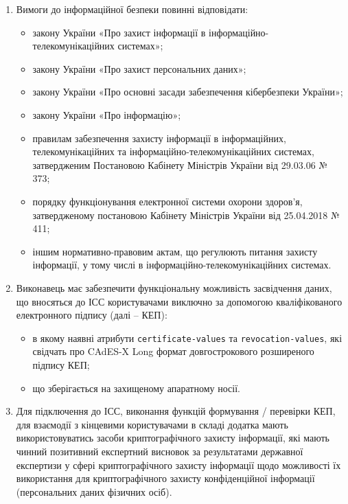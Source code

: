 \documentclass{article}
\begin{document}
\begin{enumerate}
  \item Вимоги до інформаційної безпеки повинні відповідати:
    \begin{itemize}
      \item закону України «Про захист інформації в інформаційно-телекомунікаційних системах»;
      \item закону України «Про захист персональних даних»;
      \item закону України «Про основні засади забезпечення кібербезпеки України»;
      \item закону України «Про інформацію»;
      \item правилам забезпечення захисту інформації в інформаційних, телекомунікаційних та інформаційно-телекомунікаційних системах, затвердженим Постановою Кабінету Міністрів України від 29.03.06 № 373;
      \item порядку функціонування електронної системи охорони здоров’я, затвердженому постановою Кабінету Міністрів України від 25.04.2018 № 411;
      \item іншим нормативно-правовим актам, що регулюють питання захисту інформації, у тому числі в інформаційно-телекомунікаційних системах.
    \end{itemize}

  \item Виконавець має забезпечити функціональну можливість засвідчення даних, що вносяться до ІСС
        користувачами виключно за допомогою кваліфікованого електронного підпису (далі – КЕП):
    \begin{itemize}
      \item в якому наявні атрибути \texttt{certificate-values} та \texttt{revocation-values},
            які свідчать про CAdES-X Long формат довгострокового розширеного підпису КЕП;
      \item що зберігається на захищеному апаратному носії.
    \end{itemize}

  \item Для підключення до ІСС, виконання функцій формування / перевірки КЕП, для взаємодії з кінцевими
        користувачами в складі додатка мають використовуватись засоби криптографічного захисту інформації,
        які мають чинний позитивний експертний висновок за результатами державної експертизи у сфері
        криптографічного захисту інформації щодо можливості їх використання для криптографічного захисту
        конфіденційної інформації (персональних даних фізичних осіб).


\end{enumerate}
\end{document}
